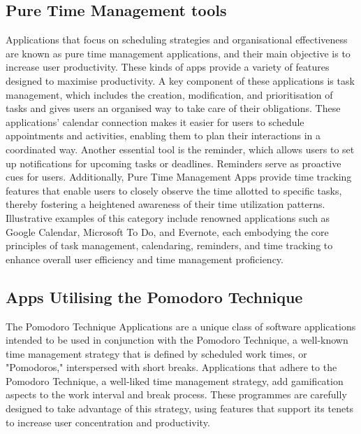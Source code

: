 \documentclass{l4proj}
\begin{document}
\subsection{Pure Time Management tools} 
Applications that focus on scheduling strategies and organisational effectiveness are known as pure time management applications, and their main objective is to increase user productivity. These kinds of apps provide a variety of features designed to maximise productivity. A key component of these applications is task management, which includes the creation, modification, and prioritisation of tasks and gives users an organised way to take care of their obligations. These applications' calendar connection makes it easier for users to schedule appointments and activities, enabling them to plan their interactions in a coordinated way. Another essential tool is the reminder, which allows users to set up notifications for upcoming tasks or deadlines. Reminders serve as proactive cues for users. Additionally, Pure Time Management Apps provide time tracking features that enable users to closely observe the time allotted to specific tasks, thereby fostering a heightened awareness of their time utilization patterns. Illustrative examples of this category include renowned applications such as Google Calendar, Microsoft To Do, and Evernote, each embodying the core principles of task management, calendaring, reminders, and time tracking to enhance overall user efficiency and time management proficiency.



\subsection{Apps Utilising the Pomodoro Technique}
The Pomodoro Technique Applications are a unique class of software applications intended to be used in conjunction with the Pomodoro Technique, a well-known time management strategy that is defined by scheduled work times, or "Pomodoros," interspersed with short breaks. Applications that adhere to the Pomodoro Technique, a well-liked time management strategy, add gamification aspects to the work interval and break process. These programmes are carefully designed to take advantage of this strategy, using features that support its tenets to increase user concentration and productivity.
\end{document}
